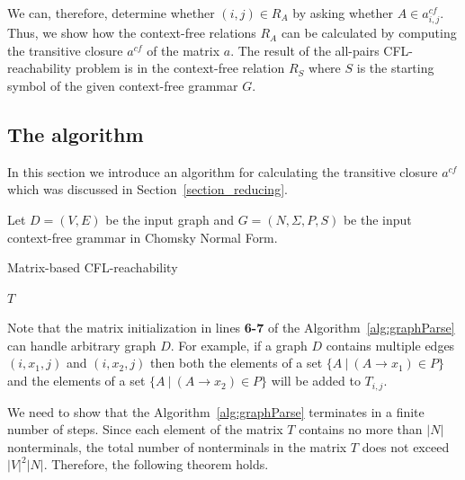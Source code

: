 \documentclass[runningheads,a4paper]{llncs}
\begin{document}
We can, therefore, determine whether $(i,j) \in R_A$ by asking whether $A \in a^{cf}_{i,j}$. Thus, we show how the context-free relations $R_A$ can be calculated by computing the transitive closure $a^{cf}$ of the matrix $a$. The result of the all-pairs CFL-reachability problem is in the context-free relation $R_S$ where $S$ is the starting symbol of the given context-free grammar $G$.



\subsection{The algorithm} \label{section_algorithm}
In this section we introduce an algorithm for calculating the transitive closure $a^{cf}$ which was discussed in Section~\ref{section_reducing}.

Let $D = (V, E)$ be the input graph and $G = (N,\Sigma,P,S)$ be the input context-free grammar in Chomsky Normal Form.

\begin{algorithm}[H]
	\begin{algorithmic}[1]
		\caption{Matrix-based CFL-reachability}
		\label{alg:graphParse}
		
		\EndFor    
		
		\EndWhile
		\State \Return $T$
		\EndFunction
	\end{algorithmic}
\end{algorithm}

Note that the matrix initialization in lines \textbf{6-7} of the Algorithm~\ref{alg:graphParse} can handle arbitrary graph $D$. For example, if a graph $D$ contains multiple edges $(i,x_1,j)$ and $(i,x_2,j)$ then both the elements of a set $\{A~|~(A \rightarrow x_1) \in P \}$ and the elements of a set $\{A~|~(A \rightarrow x_2) \in P \}$ will be added to $T_{i,j}$.

We need to show that the Algorithm~\ref{alg:graphParse} terminates in a finite number of steps. Since each element of the matrix $T$ contains no more than $|N|$ nonterminals, the total number of nonterminals in the matrix $T$ does not exceed $|V|^2|N|$. Therefore, the following theorem holds.
\end{document}
